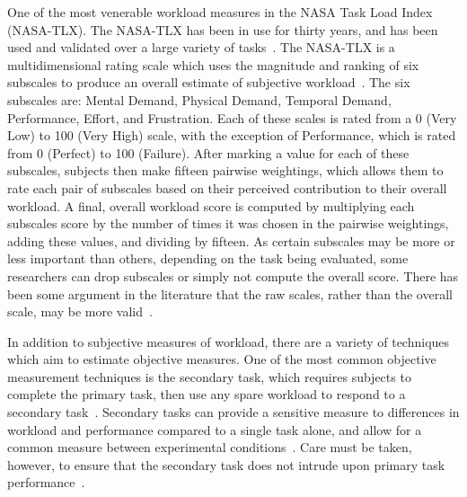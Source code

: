 \documentclass[float=false, crop=false]{standalone}
\begin{document}
One of the most venerable workload measures in the NASA Task Load Index (NASA-TLX).
The NASA-TLX has been in use for thirty years, and has been used and validated over a large variety of tasks~\cite{Hart2006}.
The NASA-TLX is a multidimensional rating scale which uses the magnitude and ranking of six subscales to produce an overall estimate of subjective workload~\cite{Hart1988}.
The six subscales are: Mental Demand, Physical Demand, Temporal Demand, Performance, Effort, and Frustration.
Each of these scales is rated from a 0 (Very Low) to 100 (Very High) scale, with the exception of Performance, which is rated from 0 (Perfect) to 100 (Failure).
After marking a value for each of these subscales, subjects then make fifteen pairwise weightings, which allows them to rate each pair of subscales based on their perceived contribution to their overall workload.
A final, overall workload score is computed by multiplying each subscales score by the number of times it was chosen in the pairwise weightings, adding these values, and dividing by fifteen.
As certain subscales may be more or less important than others, depending on the task being evaluated, some researchers can drop subscales or simply not compute the overall score.
There has been some argument in the literature that the raw scales, rather than the overall scale, may be more valid~\cite{bustamante2008measurement}.

In addition to subjective measures of workload, there are a variety of techniques which aim to estimate objective measures.
One of the most common objective measurement techniques is the secondary task, which requires subjects to complete the primary task, then use any spare workload to respond to a secondary task~\cite{gawron2008human}.
Secondary tasks can provide a sensitive measure to differences in workload and performance compared to a single task alone, and allow for a common measure between experimental conditions~\cite{slocum1971meaningful}.
Care must be taken, however, to ensure that the secondary task does not intrude upon primary task performance~\cite{williges1979behavioral}.

\end{document}
